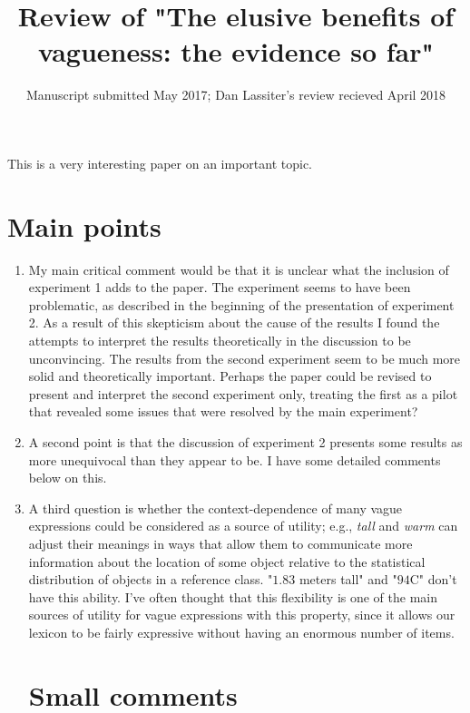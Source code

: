 \documentclass{tufte-handout}
\title{Review of "The elusive benefits of vagueness: the evidence so far"}
\date{Manuscript submitted May 2017; Dan Lassiter's review recieved April 2018}
\begin{document}
\maketitle

This is a very interesting paper on an important topic. 

\section{Main points}

\begin{enumerate}

\item My main critical comment would be that it is unclear what the inclusion of experiment 1 adds to the paper. The experiment seems to have been problematic, as described in the beginning of the presentation of experiment 2. As a result of this skepticism about the cause of the results I found the attempts to interpret the results theoretically in the discussion to be unconvincing. The results from the second experiment seem to be much more solid and theoretically important. Perhaps the paper could be revised to present and interpret the second experiment only, treating the first as a pilot that revealed some issues that were resolved by the main experiment?

\item A second point is that the discussion of experiment 2 presents some results as more unequivocal than they appear to be. I have some detailed comments below on this.

\item A third question is whether the context-dependence of many vague expressions could be considered as a source of utility; e.g., \emph{tall} and \emph{warm} can adjust their meanings in ways that allow them to communicate more information about the location of some object relative to the statistical distribution of objects in a reference class. "$1.83$ meters tall" and "$94$\textdegree C" don't have this ability. I've often thought that this flexibility is one of the main sources of utility for vague expressions with this property, since it allows our lexicon to be fairly expressive without having an enormous number of items.

\section*{Small comments}


\end{enumerate}
\end{document}
